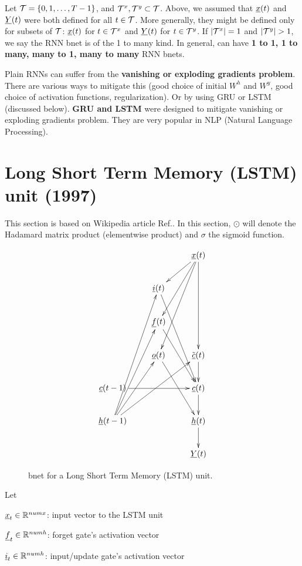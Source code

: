 Let ${\cal T}=\{0,1, \dots , T-1\}$,
and
${\cal T}^x, {\cal T}^y\subset {\cal T}$.
Above, 
we assumed that 
${\underline{x}}(t)$ and ${\underline{Y}}(t)$
were both defined 
for all $t\in {\cal T}$.
More generally, they 
might be defined only
for subsets of ${\cal T}$:
${\underline{x}}(t)$ for $t\in {\cal T}^x$
and 
${\underline{Y}}(t)$ for $t\in {\cal T}^y$.
If $|{\cal T}^x|=1$ and
$|\calt^y|>1$, 
we say the RNN bnet is of
the 1 to many kind.
In general, can have 
{\bf 1 to 1, 1 to many, many to 1, 
many to many} RNN bnets.

Plain RNNs can suffer 
from the
{\bf vanishing or exploding
 gradients problem}.
There are various ways to
mitigate this (good choice of initial
$W^h$ and $W^y$, 
good choice of activation 
functions, regularization).
Or by using GRU or LSTM (discussed below).
 {\bf GRU and LSTM}
were designed to mitigate
vanishing or exploding gradients problem.
They are very popular in NLP (Natural
Language Processing).



\newpage

\section*{Long  
Short Term Memory (LSTM) unit (1997)}

This section
is based on Wikipedia article 
Ref.\cite{lstm}. In this section,
$\odot$
will denote the Hadamard matrix product
(elementwise product)  
and $\sigma$ the sigmoid function.

\begin{figure}[h!]
\centering
$$\xymatrix{
&&\rvx(t)\ar[ddd]\ar[dl]\ar[ldd]\ar[lddd]
\\
&\rvi(t)\ar[rddd]
&\\
&\rvf(t)\ar[rdd]&\\
&\rvo(t)\ar[ddr]
&\tilde{\rvc}(t)\ar[d]
\\
\rvc(t-1)\ar[rr]
&&\rvc(t)\ar[d]
\\
\rvh(t-1)\ar[ruuuu]\ar[ruuu]\ar[ruu]\ar[rruu]
&&\rvh(t)\ar[d]\\
&&\rvY(t)
}$$
\caption{
bnet for a Long Short Term Memory
 (LSTM) unit.}
\label{fig-rnn-lstm}
\end{figure}

Let

${\underline{x}}_{t}\in { \mathbb{R}}^{numx}$: 
input vector to the LSTM unit

${\underline{f}}_{t}\in { \mathbb{R}}^{numh}$:
forget gate's activation vector

${\underline{i}}_{t}\in { \mathbb{R}}^{numh}$: 
input/update gate's activation vector

